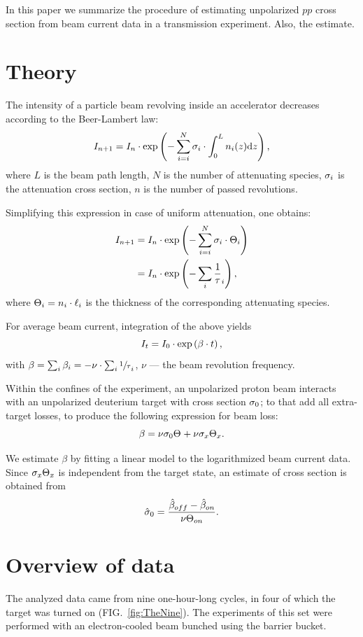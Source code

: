 \documentclass[reprint]{revtex4-1}
\newcommand{\td}{\mathrm{d}}
\begin{document}
\begin{abstractname}
In this paper we summarize the procedure of estimating unpolarized $pp$ cross section from beam current data in a transmission experiment. Also, the estimate.
\end{abstractname}


\section{Theory}
The intensity of a particle beam revolving inside an accelerator decreases according to the Beer-Lambert law:
\[
	I_{n+1} = I_n \cdot \exp\bkt{-\sum_{i=i}^N \CS[i]\cdot\int_0^L n_i(z)\td z},
\]
where $L$ is the beam path length, $N$ is the number of attenuating species, $\CS[i]$ is the attenuation cross section, $n$ is the number of passed revolutions.

Simplifying this expression in case of uniform attenuation, one obtains:
\begin{align*}
	I_{n+1} &= I_n \cdot \exp\bkt{-\sum_{i=i}^N \CS[i]\cdot \Thick[i]} \\
			&= I_n \cdot \exp\bkt{-\sum_i\frac1\tau_i},
\end{align*}
where $\Thick[i] = n_i\cdot\ell_i$ is the thickness of the corresponding attenuating species.

For average beam current, integration of the above yields
\[
	I_t = I_0 \cdot \exp\bkt{\slp\cdot t},
\]
with $\slp = \sum_i \slp[i] = - \nu\cdot\sum_i \sfrac1\tau_i$, $\nu$ --- the beam revolution frequency.

Within the confines of the experiment, an unpolarized proton beam interacts with an unpolarized deuterium target with cross section $\CS[0]$; to that add all extra-target losses, to produce the following expression for beam loss:
\[
	\slp = \nu\CS[0]\Thick + \nu\CS[x]\Thick[x].
\]

We estimate $\beta$ by fitting a linear model to the logarithmized beam current data. Since $\CS[x]\Thick[x]$ is independent from the target state, an estimate of cross section is obtained from 
\begin{equation}
	\CS*[0] = \frac{\slp*[off] - \slp*[on]}{\nu\Thick[on]}.
\end{equation}

\section{Overview of data}
The analyzed data came from nine one-hour-long cycles, in four of which the target was turned on (FIG.~\ref{fig:TheNine}). The experiments of this set were performed with an electron-cooled beam bunched using the barrier bucket.
\end{document}
